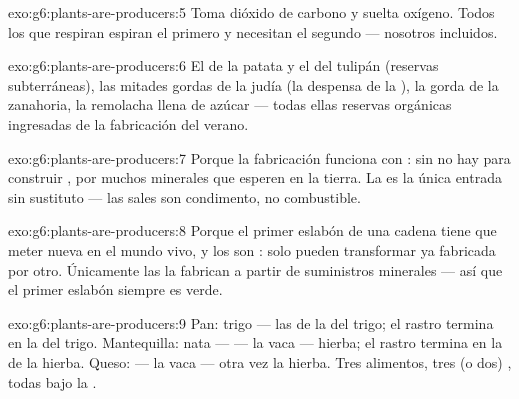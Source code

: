 \begin{solution}{exo:g6:plants-are-producers:5}
Toma dióxido de carbono y suelta oxígeno. Todos los  que
respiran espiran el primero y necesitan el segundo --- nosotros
incluidos.
\end{solution}

\begin{solution}{exo:g6:plants-are-producers:6}
El  de la patata y el  del tulipán (reservas
subterráneas), las mitades gordas de la judía (la despensa de la
), la  gorda de la zanahoria, la remolacha llena de azúcar
--- todas ellas reservas orgánicas ingresadas de la fabricación del
verano.
\end{solution}

\begin{solution}{exo:g6:plants-are-producers:7}
Porque la fabricación funciona con : sin  no hay  para
construir , por muchos minerales que esperen en la
tierra. La  es la única entrada sin sustituto --- las sales son
condimento, no combustible.
\end{solution}

\begin{solution}{exo:g6:plants-are-producers:8}
Porque el primer eslabón de una cadena tiene que meter 
nueva en el mundo vivo, y los  son : solo pueden
transformar  ya fabricada por otro. Únicamente las
 la fabrican a partir de suministros minerales --- así que
el primer eslabón siempre es verde.
\end{solution}

\begin{solution}{exo:g6:plants-are-producers:9}
Pan: trigo --- las  de la  del trigo; el rastro termina
en la  del trigo. Mantequilla: nata ---  --- la vaca ---
hierba; el rastro termina en la  de la hierba. Queso:  --- la
vaca --- otra vez la hierba. Tres alimentos, tres (o dos) , todas
bajo la .
\end{solution}

